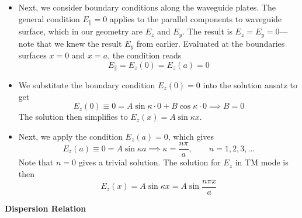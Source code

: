 \documentclass[11pt, a4paper]{article}
\begin{document}
\begin{itemize}
	\item Next, we consider boundary conditions along the waveguide plates. The general condition $ E_{\parallel} = 0 $ applies to the parallel components to waveguide surface, which in our geometry are $ E_{z} $ and $ E_{y} $. The result is $ E_{z} = E_{y} = 0 $---note that we knew the result $ E_{y} $ from earlier. Evaluated at the boundaries surfaces $ x = 0 $ and $ x = a $, the condition reads
	\begin{equation*}
		E_{\parallel} = E_{z}(0) = E_{z}(a) = 0
	\end{equation*}
	
	\item We substitute the boundary condition $ E_{z}(0) = 0$ into the solution ansatz to get
	\begin{equation*}
		E_{z}(0) \equiv 0 = A\sin \kappa \cdot 0 + B \cos \kappa \cdot 0 \implies B = 0
	\end{equation*}
	The solution then simplifies to $ E_{z}(x) = A\sin \kappa x  $. 
	
	\item Next, we apply the condition $ E_{z}(a) = 0 $, which gives
	\begin{equation*}
		E_{z}(a) \equiv 0 = A\sin \kappa a \implies \kappa = \frac{n\pi}{a}, \qquad n = 1, 2, 3, \ldots
	\end{equation*}
	Note that $ n = 0 $ gives a trivial solution. The solution for $ E_{z} $ in TM mode is then
	\begin{equation*}
		E_{z}(x) = A\sin \kappa x = A \sin \frac{n\pi x}{a}
	\end{equation*}
\end{itemize}
\textbf{Dispersion Relation}
\end{document}
